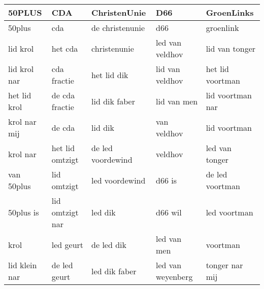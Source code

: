\begin{tabular}{lllll}
\toprule
        50PLUS &              CDA &       ChristenUnie &                D66 &        GroenLinks \\
\midrule
        50plus &              cda &    de christenunie &                d66 &         groenlink \\
      lid krol &          het cda &       christenunie &    led van veldhov &    lid van tonger \\
  lid krol nar &      cda fractie &        het lid dik &    lid van veldhov &  het lid voortman \\
  het lid krol &   de cda fractie &      lid dik faber &        lid van men &  lid voortman nar \\
  krol nar mij &           de cda &            lid dik &        van veldhov &      lid voortman \\
      krol nar &  het lid omtzigt &  de led voordewind &            veldhov &    led van tonger \\
    van 50plus &      lid omtzigt &     led voordewind &             d66 is &   de led voortman \\
     50plus is &  lid omtzigt nar &            led dik &            d66 wil &      led voortman \\
          krol &        led geurt &         de led dik &        led van men &          voortman \\
 lid klein nar &     de led geurt &      led dik faber &  led van weyenberg &    tonger nar mij \\
\bottomrule
\end{tabular}
